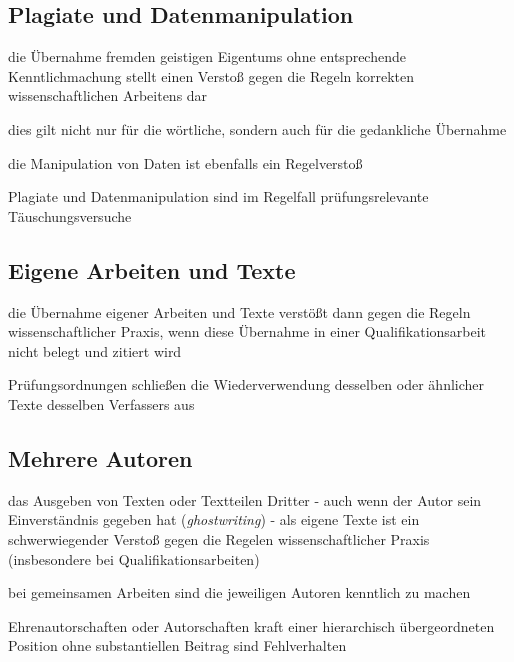 \documentclass[a4paper,oneside,DIV8,10pt]{scrartcl}
\begin{document}
    \subsection{Plagiate und Datenmanipulation}
    \begin{compactitem}
        \item die Übernahme fremden geistigen Eigentums ohne entsprechende
        Kenntlichmachung stellt einen Verstoß gegen die Regeln korrekten 
        wissenschaftlichen Arbeitens dar
        \item dies gilt nicht nur für die wörtliche, sondern auch für die 
        gedankliche Übernahme
        \item die Manipulation von Daten ist ebenfalls ein Regelverstoß
        \item Plagiate und Datenmanipulation sind im Regelfall 
        prüfungsrelevante Täuschungsversuche
    \end{compactitem}

    \subsection{Eigene Arbeiten und Texte}
    \begin{compactitem}
        \item die Übernahme eigener Arbeiten und Texte verstößt dann gegen 
        die Regeln wissenschaftlicher Praxis, wenn diese Übernahme in einer
        Qualifikationsarbeit nicht belegt und zitiert wird
        \item Prüfungsordnungen schließen die Wiederverwendung desselben oder 
        ähnlicher Texte desselben Verfassers aus 
    \end{compactitem}

    \subsection{Mehrere Autoren}
    \begin{compactitem}
        \item das Ausgeben von Texten oder Textteilen Dritter - auch wenn 
        der Autor sein Einverständnis gegeben hat (\textit{ghostwriting}) - als eigene Texte ist ein 
        schwerwiegender Verstoß gegen die Regelen wissenschaftlicher Praxis 
        (insbesondere bei Qualifikationsarbeiten)
        \item bei gemeinsamen Arbeiten sind die jeweiligen Autoren kenntlich 
        zu machen
        \item Ehrenautorschaften oder Autorschaften kraft einer hierarchisch
        übergeordneten Position ohne substantiellen Beitrag sind Fehlverhalten
    \end{compactitem}
\end{document}
